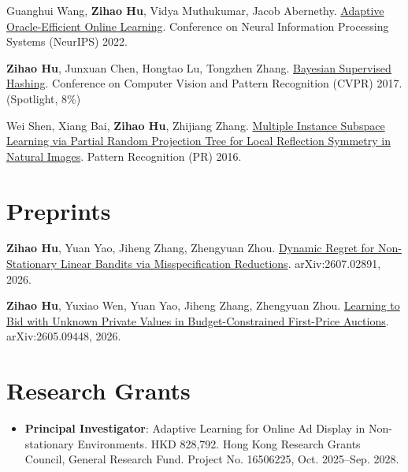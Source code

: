 \documentclass[letterpaper,10pt]{article}
\newcommand{\resumeItem}[2]{
  \item\small{
    \textbf{#1}{: #2 \vspace{-2pt}}
  }
}
\newcommand{\resumeSubItem}[2]{\resumeItem{#1}{#2}\vspace{-4pt}}
\newcommand{\resumeSubHeadingListStart}{\begin{itemize}[leftmargin=*]}
\newcommand{\resumeSubHeadingListEnd}{\end{itemize}}
\begin{document}
\begin{description}[font=$\bullet$]
    \item {Guanghui Wang, \textbf{Zihao Hu}, Vidya Muthukumar, Jacob Abernethy. \href{https://papers.nips.cc/paper_files/paper/2022/hash/948106cb5a114684a64c89a1e517e3fe-Abstract-Conference.html}{Adaptive Oracle-Efficient Online Learning}. Conference on Neural Information Processing Systems (NeurIPS) 2022.}
    \item {\textbf{Zihao Hu}, Junxuan Chen, Hongtao Lu, Tongzhen Zhang. \href{http://ieeexplore.ieee.org/document/8099833}{Bayesian Supervised Hashing}. Conference on Computer Vision and Pattern Recognition (CVPR) 2017. (Spotlight, 8\%)}
    \item {Wei Shen, Xiang Bai, \textbf{Zihao Hu}, Zhijiang Zhang. \href{http://www.sciencedirect.com/science/article/pii/S0031320315003945}{Multiple Instance Subspace Learning via Partial Random Projection Tree for Local Reflection Symmetry in Natural Images}. Pattern Recognition (PR) 2016.} 
    \end{description}

\section{Preprints}
\begin{description}[font=$\bullet$]
    \item \textbf{Zihao Hu}, Yuan Yao, Jiheng Zhang, Zhengyuan Zhou. \href{https://arxiv.org/abs/2607.02891}{Dynamic Regret for Non-Stationary Linear Bandits via Misspecification Reductions}. arXiv:2607.02891, 2026.
    \item \textbf{Zihao Hu}, Yuxiao Wen, Yuan Yao, Jiheng Zhang, Zhengyuan Zhou. \href{https://arxiv.org/abs/2605.09448}{Learning to Bid with Unknown Private Values in Budget-Constrained First-Price Auctions}. arXiv:2605.09448, 2026.
\end{description}

\section{Research Grants}
	\resumeSubHeadingListStart
    \resumeSubItem{Principal Investigator}{Adaptive Learning for Online Ad Display in Non-stationary Environments. HKD 828,792. Hong Kong
Research Grants Council, General Research Fund. Project No. 16506225, Oct. 2025--Sep. 2028.}
\resumeSubHeadingListEnd
\end{document}

